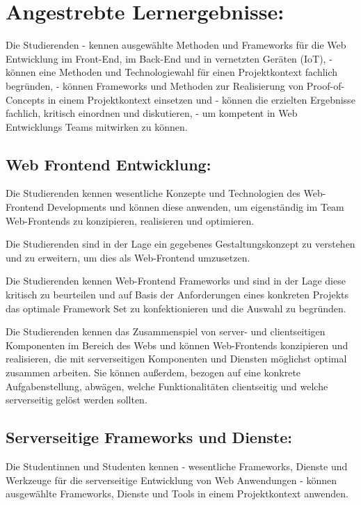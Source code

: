 \section{Angestrebte
Lernergebnisse:}\label{angestrebte-lernergebnisse-30}

Die Studierenden - kennen ausgewählte Methoden und Frameworks für die
Web Entwicklung im Front-End, im Back-End und in vernetzten Geräten
(IoT), - können eine Methoden und Technologiewahl für einen
Projektkontext fachlich begründen, - können Frameworks und Methoden zur
Realisierung von Proof-of-Concepts in einem Projektkontext einsetzen und
- können die erzielten Ergebnisse fachlich, kritisch einordnen und
diskutieren, - um kompetent in Web Entwicklungs Teams mitwirken zu
können.

\subsection{Web Frontend
Entwicklung:}\label{web-frontend-entwicklung}

Die Studierenden kennen wesentliche Konzepte und Technologien des
Web-Frontend Developments und können diese anwenden, um eigenständig im
Team Web-Frontends zu konzipieren, realisieren und optimieren.

Die Studierenden sind in der Lage ein gegebenes Gestaltungskonzept zu
verstehen und zu erweitern, um dies als Web-Frontend umzusetzen.

Die Studierenden kennen Web-Frontend Frameworks und sind in der Lage
diese kritisch zu beurteilen und auf Basis der Anforderungen eines
konkreten Projekts das optimale Framework Set zu konfektionieren und die
Auswahl zu begründen.

Die Studierenden kennen das Zusammenspiel von server- und clientseitigen
Komponenten im Bereich des Webs und können Web-Frontends konzipieren und
realisieren, die mit serverseitigen Komponenten und Diensten möglichst
optimal zusammen arbeiten. Sie können außerdem, bezogen auf eine
konkrete Aufgabenstellung, abwägen, welche Funktionalitäten clientseitig
und welche serverseitig gelöst werden sollten.

\subsection{Serverseitige Frameworks und
Dienste:}\label{serverseitige-frameworks-und-dienste}

Die Studentinnen und Studenten kennen - wesentliche Frameworks, Dienste
und Werkzeuge für die serverseitige Entwicklung von Web Anwendungen -
können ausgewählte Frameworks, Dienste und Tools in einem Projektkontext
anwenden.

